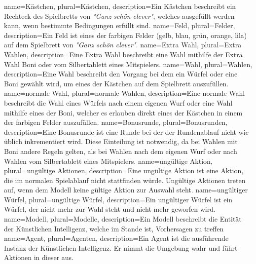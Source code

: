 {
	name=Kästchen,
	plural=Kästchen,
	description={Ein Kästchen beschreibt ein Rechteck des Spielbretts von \textit{"Ganz schön clever"}, welches ausgefüllt werden kann, wenn bestimmte Bedingungen erfüllt sind.}
}
{
	name=Feld,
	plural=Felder,
	description={Ein Feld ist eines der farbigen Felder (gelb, blau, grün, orange, lila) auf dem Spielbrett von \textit{"Ganz schön clever"}.}
}
{
	name=Extra Wahl,
	plural=Extra Wahlen,
	description={Eine Extra Wahl beschreibt eine Wahl mithilfe der Extra Wahl Boni oder vom Silbertablett eines Mitspielers.}
}
{
	name=Wahl,
	plural=Wahlen,
	description={Eine Wahl beschreibt den Vorgang bei dem ein Würfel oder eine Boni gewählt wird, um eines der Kästchen auf dem Spielbrett auszufüllen.\newpage}
}
{
	name=normale Wahl,
	plural=normale Wahlen,
	description={Eine normale Wahl beschreibt die Wahl eines Würfels nach einem eigenen Wurf oder eine Wahl mithilfe eines der Boni, welcher es erlauben direkt eines der Kästchen in einem der farbigen Felder auszufüllen.}
}
{
	name=Bonusrunde,
	plural=Bonusrunden,
	description={Eine Bonusrunde ist eine Runde bei der der Rundenablauf nicht wie üblich inkrementiert wird. Diese Einteilung ist notwendig, da bei Wahlen mit Boni andere Regeln gelten, als bei Wahlen nach dem eigenen Wurf oder nach Wahlen vom Silbertablett eines Mitspielers.}
}
{
	name=ungültige Aktion,
	plural=ungültige Aktionen,
	description={Eine ungültige Aktion ist eine Aktion, die im normalen Spielablauf nicht stattfinden würde. Ungültige Aktionen treten auf, wenn dem Modell keine gültige Aktion zur Auswahl steht.}
}
{
	name=ungültiger Würfel,
	plural=ungültige Würfel,
	description={Ein ungültiger Würfel ist ein Würfel, der nicht mehr zur Wahl steht und nicht mehr geworfen wird.}
}
{
	name=Modell,
	plural=Modelle,
	description={Ein Modell beschreibt die Entität der Künstlichen Intelligenz, welche im Stande ist, Vorhersagen zu treffen}
}
{
	name=Agent,
	plural=Agenten,
	description={Ein Agent ist die ausführende Instanz der Künstlichen Intelligenz. Er nimmt die Umgebung wahr und führt Aktionen in dieser aus.}
}